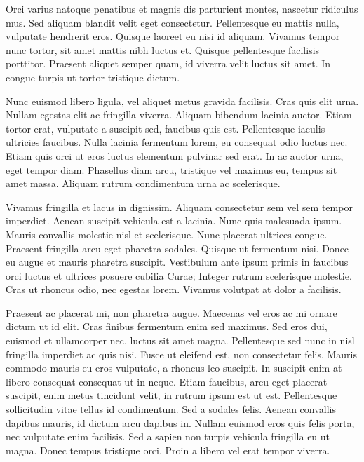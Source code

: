 \documentclass[twoside]{article}
\begin{document}
\begin{multicols}{2}
  Orci varius natoque penatibus et magnis dis parturient montes, nascetur ridiculus mus. Sed aliquam blandit velit eget consectetur. Pellentesque eu mattis nulla, vulputate hendrerit eros. Quisque laoreet eu nisi id aliquam. Vivamus tempor nunc tortor, sit amet mattis nibh luctus et. Quisque pellentesque facilisis porttitor. Praesent aliquet semper quam, id viverra velit luctus sit amet. In congue turpis ut tortor tristique dictum.

  Nunc euismod libero ligula, vel aliquet metus gravida facilisis. Cras quis elit urna. Nullam egestas elit ac fringilla viverra. Aliquam bibendum lacinia auctor. Etiam tortor erat, vulputate a suscipit sed, faucibus quis est. Pellentesque iaculis ultricies faucibus. Nulla lacinia fermentum lorem, eu consequat odio luctus nec. Etiam quis orci ut eros luctus elementum pulvinar sed erat. In ac auctor urna, eget tempor diam. Phasellus diam arcu, tristique vel maximus eu, tempus sit amet massa. Aliquam rutrum condimentum urna ac scelerisque.



  Vivamus fringilla et lacus in dignissim. Aliquam consectetur sem vel sem tempor imperdiet. Aenean suscipit vehicula est a lacinia. Nunc quis malesuada ipsum. Mauris convallis molestie nisl et scelerisque. Nunc placerat ultrices congue. Praesent fringilla arcu eget pharetra sodales. Quisque ut fermentum nisi. Donec eu augue et mauris pharetra suscipit. Vestibulum ante ipsum primis in faucibus orci luctus et ultrices posuere cubilia Curae; Integer rutrum scelerisque molestie. Cras ut rhoncus odio, nec egestas lorem. Vivamus volutpat at dolor a facilisis.

  Praesent ac placerat mi, non pharetra augue. Maecenas vel eros ac mi ornare dictum ut id elit. Cras finibus fermentum enim sed maximus. Sed eros dui, euismod et ullamcorper nec, luctus sit amet magna. Pellentesque sed nunc in nisl fringilla imperdiet ac quis nisi. Fusce ut eleifend est, non consectetur felis. Mauris commodo mauris eu eros vulputate, a rhoncus leo suscipit. In suscipit enim at libero consequat consequat ut in neque. Etiam faucibus, arcu eget placerat suscipit, enim metus tincidunt velit, in rutrum ipsum est ut est. Pellentesque sollicitudin vitae tellus id condimentum. Sed a sodales felis. Aenean convallis dapibus mauris, id dictum arcu dapibus in. Nullam euismod eros quis felis porta, nec vulputate enim facilisis. Sed a sapien non turpis vehicula fringilla eu ut magna. Donec tempus tristique orci. Proin a libero vel erat tempor viverra.


\end{multicols}
\end{document}
